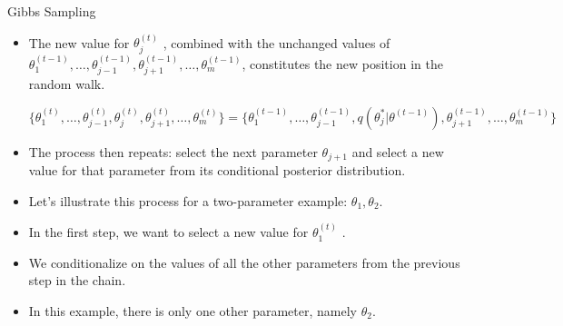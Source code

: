 \documentclass[handout]{beamer}
\begin{document}
\begin{frame}{Gibbs Sampling}
\scriptsize{

\begin{itemize}

\item The new value for $\theta_j^{(t)}$ , combined with the unchanged values of $\theta^{(t-1)}_1,\dots, \theta^{(t-1)}_{j-1}, \theta^{(t-1)}_{j+1}, \dots,\theta^{(t-1)}_m$, constitutes the new position in the random walk.

\begin{displaymath}
 \{\theta^{(t)}_1,\dots, \theta^{(t)}_{j-1}, \theta^{(t)}_{j}, \theta^{(t)}_{j+1}, \dots,\theta^{(t)}_m\} =  \{\theta^{(t-1)}_1,\dots, \theta^{(t-1)}_{j-1}, q(\theta^{*}_j|\theta^{(t-1)}), \theta^{(t-1)}_{j+1}, \dots,\theta^{(t-1)}_m\}
\end{displaymath}


\item The process then repeats: select the next parameter $\theta_{j+1}$ and select a new value for that parameter from its conditional posterior distribution.

\item Let's illustrate this process for a two-parameter example: $\theta_1,\theta_2$.

\item In the first step, we want to select a new value for $\theta_1^{(t)}$ .

\item We conditionalize on the values of all the other
parameters from the previous step in the chain.

\item In this example, there is only one other parameter, namely $\theta_2$.


\end{itemize}


}
\end{frame}
\end{document}
